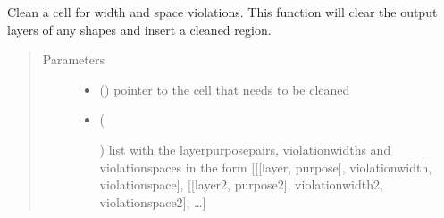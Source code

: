 \documentclass[a4paper,10pt,english]{sphinxmanual}
\begin{document}
\begin{fulllineitems}
\label{\detokenize{drc/drc:kppc.drc.clean}}
Clean a cell for width and space violations.
This function will clear the output layers of any shapes and insert a cleaned region.
\begin{quote}\begin{description}
\item[{Parameters}] \leavevmode\begin{itemize}
\item {} 
 () \textendash{} pointer to the cell that needs to be cleaned

\item {} 
 (%
\begin{footnote}[5]\sphinxAtStartFootnote
{}
%
\end{footnote}) \textendash{} list with the layerpurposepairs, violationwidths and violationspaces in the form {[}{[}{[}layer,
purpose{]}, violationwidth, violationspace{]}, {[}{[}layer2, purpose2{]}, violationwidth2, violationspace2{]}, …{]}

\end{itemize}

\end{description}\end{quote}

\end{fulllineitems}

\end{document}
